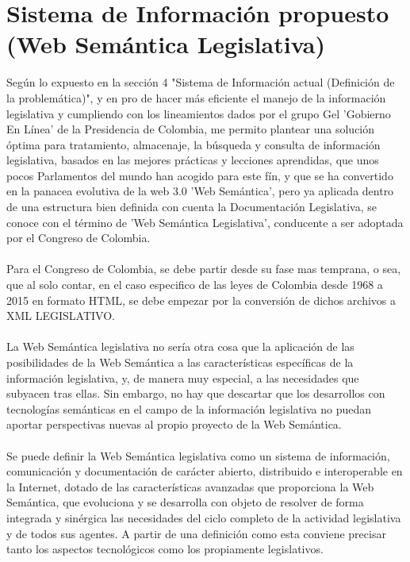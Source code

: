 \documentclass[conference]{IEEEtran}
\begin{document}
\section{Sistema de Información propuesto (Web Semántica Legislativa)}
   Según lo expuesto en la sección 4 "Sistema de Información actual (Definición de la problemática)", y en pro de hacer más eficiente el manejo de la información legislativa y cumpliendo con los lineamientos dados por el grupo Gel 'Gobierno En Línea' de la Presidencia de Colombia,  me permito plantear una solución óptima para tratamiento, almacenaje, la búsqueda y consulta de información legislativa, basados en las mejores prácticas y lecciones aprendidas, que unos pocos Parlamentos del mundo han acogido para este fín, y que se ha convertido en la panacea evolutiva de la web 3.0 'Web Semántica', pero ya aplicada dentro de una estructura bien definida con cuenta la Documentación Legislativa, se conoce con el término de 'Web Semántica Legislativa', conducente a ser adoptada por el Congreso de Colombia. \\ \\ 
   Para el Congreso de Colombia, se debe partir desde su fase mas temprana, o sea, que al solo contar, en el caso especifico de las leyes de Colombia desde 1968 a 2015 en formato HTML, se debe empezar por la conversión de dichos archivos a XML LEGISLATIVO.\\ \\
   La Web Semántica legislativa no sería otra cosa que la aplicación de las posibilidades de la Web Semántica a las características específicas de la información legislativa, y, de manera muy especial, a las necesidades que subyacen tras ellas. Sin embargo, no hay que descartar que los desarrollos con tecnologías semánticas en el campo de la información legislativa no puedan aportar perspectivas nuevas al propio proyecto de la Web Semántica.\\ \\
   Se puede definir la Web Semántica legislativa como un sistema de información, comunicación y documentación de carácter abierto, distribuido e interoperable en la Internet, dotado de las características avanzadas que proporciona la Web Semántica, que evoluciona y se desarrolla con objeto de resolver de forma integrada y sinérgica las necesidades del ciclo completo de la actividad legislativa y de todos sus agentes. A partir de una definición como esta conviene precisar tanto los aspectos tecnológicos como los propiamente legislativos.
   
\end{document}
